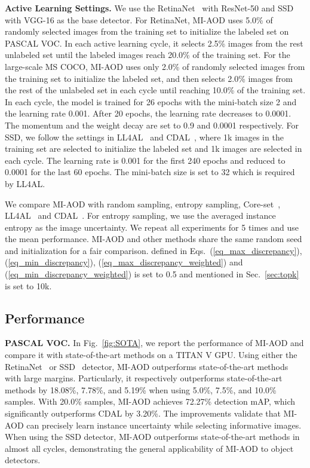 \documentclass[final]{cvpr}
\begin{document}
\textbf{Active Learning Settings.} We use the RetinaNet~\cite{RetinaNet20} with ResNet-50 and SSD~\cite{SSD16} with VGG-16 as the base detector. 
For RetinaNet, MI-AOD uses 5.0\% of randomly selected images from the training set to initialize the labeled set on PASCAL VOC. In each active learning cycle, it selects 2.5\% images from the rest unlabeled set until the labeled images reach 20.0\% of the training set. 
For the large-scale MS COCO, MI-AOD uses only 2.0\% of randomly selected images from the training set to initialize the labeled set, and then selects 2.0\% images from the rest of the unlabeled set in each cycle until reaching 10.0\% of the training set. 
In each cycle, the model is trained for 26 epochs with the mini-batch size 2 and the learning rate 0.001. After 20 epochs, the learning rate decreases to 0.0001. The momentum and the weight decay are set to 0.9 and 0.0001 respectively.
For SSD, we follow the settings in LL4AL~\cite{LearningLoss19} and CDAL~\cite{CDAL20}, where 1k images in the training set are selected to initialize the labeled set and 1k images are selected in each cycle. The learning rate is 0.001 for the first 240 epochs and reduced to 0.0001 for the last 60 epochs. The mini-batch size is set to 32 which is required by LL4AL.


We compare MI-AOD with random sampling, entropy sampling, Core-set~\cite{CoreSet18}, LL4AL~\cite{LearningLoss19} and CDAL~\cite{CDAL20}. For entropy sampling, we use the averaged instance entropy as the image uncertainty. We repeat all experiments for 5 times and use the mean performance. MI-AOD and other methods share the same random seed and initialization for a fair comparison.  defined in Eqs.~(\ref{eq_max_discrepancy}), (\ref{eq_min_discrepancy}), (\ref{eq_max_discrepancy_weighted}) and (\ref{eq_min_discrepancy_weighted}) is set to 0.5 and  mentioned in Sec.~\ref{sec:topk} is set to 10k.


\subsection{Performance}
\textbf{PASCAL VOC.} In Fig.~\ref{fig:SOTA}, we report the performance of MI-AOD and compare it with state-of-the-art methods on a TITAN V GPU. Using either the RetinaNet~\cite{RetinaNet20} or SSD~\cite{SSD2016} detector, MI-AOD outperforms state-of-the-art methods with large margins. Particularly, it respectively outperforms state-of-the-art methods by 18.08\%, 7.78\%, and 5.19\% when using 5.0\%, 7.5\%, and 10.0\% samples. With 20.0\% samples, MI-AOD achieves 72.27\% detection mAP, which significantly outperforms CDAL by 3.20\%. The improvements validate that MI-AOD can precisely learn instance uncertainty while selecting informative images. When using the SSD detector, MI-AOD outperforms state-of-the-art methods in almost all cycles, demonstrating the general applicability of MI-AOD to object detectors. 
\end{document}

